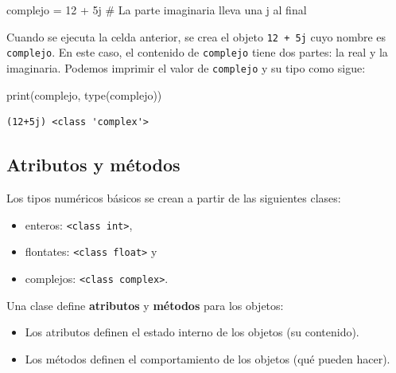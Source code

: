\documentclass[
  spanish,
  letterpaper,
]{scrbook}
\newenvironment{Shaded}{\begin{snugshade}}{\end{snugshade}}
\newcommand{\BuiltInTok}[1]{\textcolor[rgb]{0.00,0.23,0.31}{#1}}
\newcommand{\CommentTok}[1]{\textcolor[rgb]{0.37,0.37,0.37}{#1}}
\newcommand{\DecValTok}[1]{\textcolor[rgb]{0.68,0.00,0.00}{#1}}
\newcommand{\NormalTok}[1]{\textcolor[rgb]{0.00,0.23,0.31}{#1}}
\newcommand{\OperatorTok}[1]{\textcolor[rgb]{0.37,0.37,0.37}{#1}}
\newcommand{\OtherTok}[1]{\textcolor[rgb]{0.00,0.23,0.31}{#1}}
\providecommand{\tightlist}{%
  \setlength{\itemsep}{0pt}\setlength{\parskip}{0pt}}
\theoremstyle{definition}
\theoremstyle{remark}
\begin{document}
\begin{Shaded}
\begin{Highlighting}[]
\NormalTok{complejo }\OperatorTok{=} \DecValTok{12} \OperatorTok{+} \OtherTok{5j} \CommentTok{\# La parte imaginaria lleva una j al final}
\end{Highlighting}
\end{Shaded}

Cuando se ejecuta la celda anterior, se crea el objeto
\texttt{12\ +\ 5j} cuyo nombre es \texttt{complejo}. En este caso, el
contenido de \texttt{complejo} tiene dos partes: la real y la
imaginaria. Podemos imprimir el valor de \texttt{complejo} y su tipo
como sigue:

\begin{Shaded}
\begin{Highlighting}[]
\BuiltInTok{print}\NormalTok{(complejo, }\BuiltInTok{type}\NormalTok{(complejo))}
\end{Highlighting}
\end{Shaded}

\begin{verbatim}
(12+5j) <class 'complex'>
\end{verbatim}

\subsection{Atributos y métodos}\label{sec-b-atributos-metodos}

Los tipos numéricos básicos se crean a partir de las siguientes clases:

\begin{itemize}
\tightlist
\item
  enteros:
  \texttt{\textless{}class\ \textquotesingle{}int\textquotesingle{}\textgreater{}},
\item
  flontates:
  \texttt{\textless{}class\ \textquotesingle{}float\textquotesingle{}\textgreater{}}
  y
\item
  complejos:
  \texttt{\textless{}class\ \textquotesingle{}complex\textquotesingle{}\textgreater{}}.
\end{itemize}

Una clase define \textbf{atributos} y \textbf{métodos} para los objetos:

\begin{itemize}
\tightlist
\item
  Los atributos definen el estado interno de los objetos (su contenido).
\item
  Los métodos definen el comportamiento de los objetos (qué pueden
  hacer).
\end{itemize}
\end{document}
